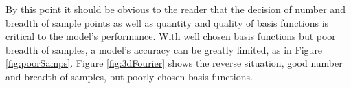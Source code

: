 \par By this point it should be obvious to the reader that the decision of number and breadth of sample points as well as quantity and quality of basis functions is critical to the model's performance. With well chosen basis functions but poor breadth of samples, a model's accuracy can be greatly limited, as in Figure \ref{fig:poorSamps}. Figure \ref{fig:3dFourier} shows the reverse situation, good number and breadth of samples, but poorly chosen basis functions. 


